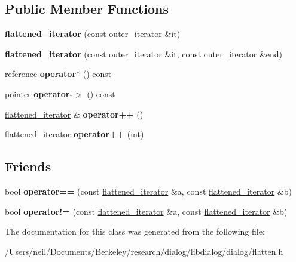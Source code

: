\subsection*{Public Member Functions}
\begin{DoxyCompactItemize}
\item 
\mbox{\label{classflattened__iterator_ac2dfde6774c28ad4c997794d856b2dcd}} 
{\bfseries flattened\+\_\+iterator} (const outer\+\_\+iterator \&it)
\item 
\mbox{\label{classflattened__iterator_aeed2f54136bb70259612bb40924457f7}} 
{\bfseries flattened\+\_\+iterator} (const outer\+\_\+iterator \&it, const outer\+\_\+iterator \&end)
\item 
\mbox{\label{classflattened__iterator_a897459880dbc31c9d8858eb36d383a11}} 
reference {\bfseries operator$\ast$} () const
\item 
\mbox{\label{classflattened__iterator_ab04a269ce11a3af92f51714e74a5ca54}} 
pointer {\bfseries operator-\/$>$} () const
\item 
\mbox{\label{classflattened__iterator_a6d34fecb2035fd3f3567f14eda770804}} 
\hyperlink{classflattened__iterator}{flattened\+\_\+iterator} \& {\bfseries operator++} ()
\item 
\mbox{\label{classflattened__iterator_afe95304470e851abf5c39457460a4275}} 
\hyperlink{classflattened__iterator}{flattened\+\_\+iterator} {\bfseries operator++} (int)
\end{DoxyCompactItemize}
\subsection*{Friends}
\begin{DoxyCompactItemize}
\item 
\mbox{\label{classflattened__iterator_a86a4b67d3b6bce700fdb0628eda4316f}} 
bool {\bfseries operator==} (const \hyperlink{classflattened__iterator}{flattened\+\_\+iterator} \&a, const \hyperlink{classflattened__iterator}{flattened\+\_\+iterator} \&b)
\item 
\mbox{\label{classflattened__iterator_aec0aeaf03886907d266dc8e73707574f}} 
bool {\bfseries operator!=} (const \hyperlink{classflattened__iterator}{flattened\+\_\+iterator} \&a, const \hyperlink{classflattened__iterator}{flattened\+\_\+iterator} \&b)
\end{DoxyCompactItemize}


The documentation for this class was generated from the following file\+:\begin{DoxyCompactItemize}
\item 
/\+Users/neil/\+Documents/\+Berkeley/research/dialog/libdialog/dialog/flatten.\+h\end{DoxyCompactItemize}
